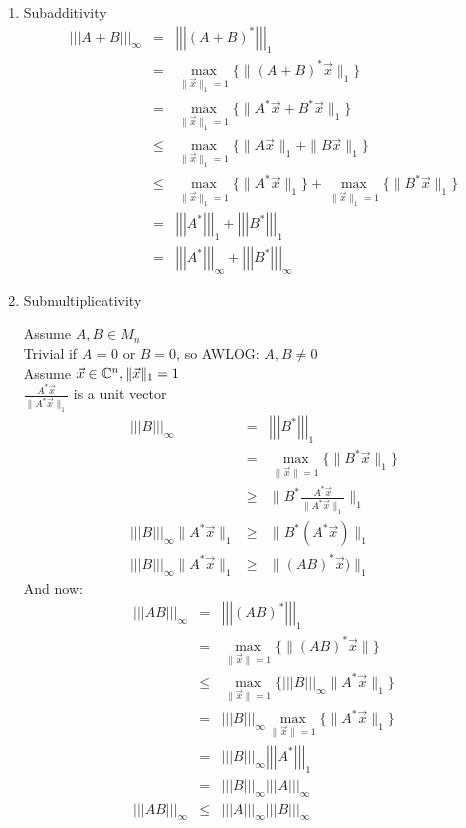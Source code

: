 \documentclass[letterpaper,12pt,fleqn]{article}
\newcommand{\mnorm}[1]{\left|\left|\left|#1\right|\right|\right|}
\newcommand{\norm}[1]{\|#1\|}
\newcommand{\vx}{\vec{x}}
\begin{document}
\begin{enumerate}
\begin{enumerate}
\begin{enumerate}
    \item Subadditivity
      \begin{eqnarray*}
        \mnorm{A+B}_{\infty} &=& \mnorm{(A+B)^*}_1 \\
        &=& \max_{\norm{\vx}_1=1}\{\norm{(A+B)^*\vx}_1\} \\
        &=& \max_{\norm{\vx}_1=1}\{\norm{A^*\vx+B^*\vx}_1\} \\
        &\le& \max_{\norm{\vx}_1=1}\{\norm{A\vx}_1+\norm{B\vx}_1\} \\
        &\le& \max_{\norm{\vx}_1=1}\{\norm{A^*\vx}_1\}+
        \max_{\norm{\vx}_1=1}\{\norm{B^*\vx}_1\} \\
        &=& \mnorm{A^*}_1+\mnorm{B^*}_1 \\
        &=& \mnorm{A^*}_{\infty}+\mnorm{B^*}_{\infty}
      \end{eqnarray*}

    \item Submultiplicativity
      
      Assume $A,B\in M_n$ \\
      Trivial if $A=0$ or $B=0$, so AWLOG: $A,B\ne0$ \\
      Assume $\vx\in\C^n,\norm{\vx}_1=1$ \\
      $\frac{A^*\vx}{\norm{A^*\vx}_1}$ is a unit vector \\
      \begin{eqnarray*}
        \mnorm{B}_{\infty} &=& \mnorm{B^*}_1 \\
        &=& \max_{\norm{\vx}=1}\{\norm{B^*\vx}_1\} \\
        &\ge& \norm{B^*\frac{A^*\vx}{\norm{A^*\vx}_1}}_1 \\
        \mnorm{B}_{\infty}\norm{A^*\vx}_1 &\ge& \norm{B^*(A^*\vx)}_1 \\
        \mnorm{B}_{\infty}\norm{A^*\vx}_1 &\ge& \norm{(AB)^*\vx)}_1
      \end{eqnarray*}
      And now:
      \begin{eqnarray*}
        \mnorm{AB}_{\infty} &=& \mnorm{(AB)^*}_1 \\
        &=& \max_{\norm{\vx}=1}\{\norm{(AB)^*\vx}\} \\
        &\le& \max_{\norm{\vx}=1}\{\mnorm{B}_{\infty}\norm{A^*\vx}_1\} \\
        &=& \mnorm{B}_{\infty}\max_{\norm{\vx}=1}\{\norm{A^*\vx}_1\} \\
        &=& \mnorm{B}_{\infty}\mnorm{A^*}_1 \\
        &=& \mnorm{B}_{\infty}\mnorm{A}_{\infty} \\
        \mnorm{AB}_{\infty} &\le& \mnorm{A}_{\infty}\mnorm{B}_{\infty}
      \end{eqnarray*}
    \end{enumerate}


\end{enumerate}
\end{enumerate}
\end{document}
